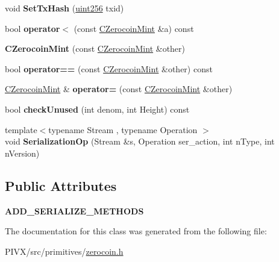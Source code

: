\begin{DoxyCompactItemize}
void {\bfseries Set\+Tx\+Hash} (\mbox{\hyperlink{classuint256}{uint256}} txid)
\item 
\mbox{\label{class_c_zerocoin_mint_a10467ce5cc59b094b44db9735693de8e}} 
bool {\bfseries operator$<$} (const \mbox{\hyperlink{class_c_zerocoin_mint}{C\+Zerocoin\+Mint}} \&a) const
\item 
\mbox{\label{class_c_zerocoin_mint_a8afb621c6d895c04e2ebcdb66346e7cf}} 
{\bfseries C\+Zerocoin\+Mint} (const \mbox{\hyperlink{class_c_zerocoin_mint}{C\+Zerocoin\+Mint}} \&other)
\item 
\mbox{\label{class_c_zerocoin_mint_a766fb8b8917ee0afaa41f49233795e07}} 
bool {\bfseries operator==} (const \mbox{\hyperlink{class_c_zerocoin_mint}{C\+Zerocoin\+Mint}} \&other) const
\item 
\mbox{\label{class_c_zerocoin_mint_a855136e027945ccacebc50745f1757fe}} 
\mbox{\hyperlink{class_c_zerocoin_mint}{C\+Zerocoin\+Mint}} \& {\bfseries operator=} (const \mbox{\hyperlink{class_c_zerocoin_mint}{C\+Zerocoin\+Mint}} \&other)
\item 
\mbox{\label{class_c_zerocoin_mint_a80abac803dd79861be847593d0664682}} 
bool {\bfseries check\+Unused} (int denom, int Height) const
\item 
\mbox{\label{class_c_zerocoin_mint_af1821fbf2a26c83d990082594d840e36}} 
{\footnotesize template$<$typename Stream , typename Operation $>$ }\\void {\bfseries Serialization\+Op} (Stream \&s, Operation ser\+\_\+action, int n\+Type, int n\+Version)
\end{DoxyCompactItemize}
\subsection*{Public Attributes}
\begin{DoxyCompactItemize}
\item 
\mbox{\label{class_c_zerocoin_mint_a3efd5c6af864a1bb2532b67f43f10b39}} 
{\bfseries A\+D\+D\+\_\+\+S\+E\+R\+I\+A\+L\+I\+Z\+E\+\_\+\+M\+E\+T\+H\+O\+DS}
\end{DoxyCompactItemize}


The documentation for this class was generated from the following file\+:\begin{DoxyCompactItemize}
\item 
P\+I\+V\+X/src/primitives/\mbox{\hyperlink{zerocoin_8h}{zerocoin.\+h}}\end{DoxyCompactItemize}
